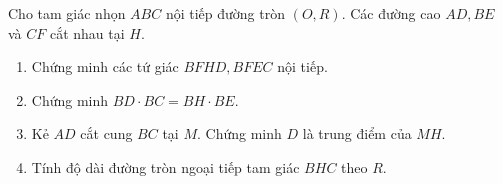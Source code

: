 \begin{ex}%
	Cho tam giác nhọn $ ABC $ nội tiếp đường tròn $ (O,R) $. Các đường cao $ AD, BE $ và $ CF $ cắt nhau tại $ H $.	
	\begin{enumerate}
		\item Chứng minh các tứ giác $ BFHD, BFEC $ nội tiếp.
		\item Chứng minh $ BD \cdot BC=BH\cdot BE $.
		\item Kẻ $ AD $ cắt cung $ BC $ tại $ M $. Chứng minh $ D $ là trung điểm của $ MH $.
		\item Tính độ dài đường tròn ngoại tiếp tam giác $ BHC $ theo $ R $.
	\end{enumerate}	
\end{ex}
